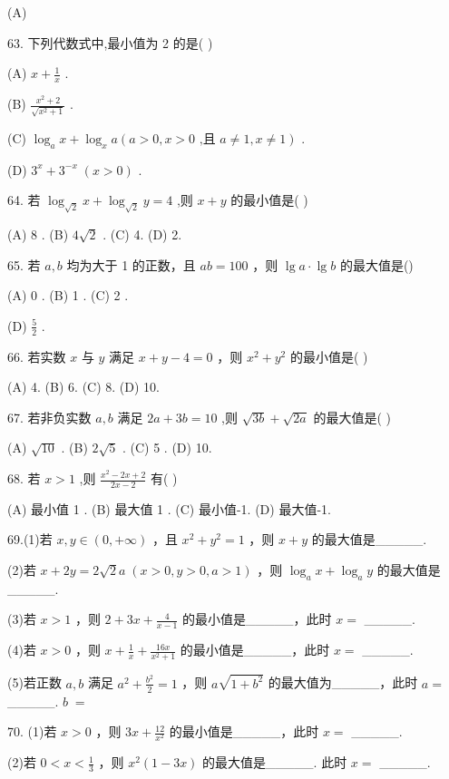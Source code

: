 \documentclass[10pt]{article}
\begin{document}
(A)

63. 下列代数式中,最小值为 2 的是( )

(A) \(x + \frac{1}{x}\) .

(B) \(\frac{{x}^{2} + 2}{\sqrt{{x}^{2} + 1}}\) .

(C) \({\log }_{a}x + {\log }_{x}a\left( {a > 0,x > 0\text{ ,且 }a \neq  1,x \neq  1}\right)\) .

(D) \({3}^{x} + {3}^{-x}\;\left( {x > 0}\right)\) .

64. 若 \({\log }_{\sqrt{2}}x + {\log }_{\sqrt{2}}y = 4\) ,则 \(x + y\) 的最小值是( )

(A) 8 . (B) \(4\sqrt{2}\) . (C) 4. (D) 2.

65. 若 \(a,b\) 均为大于 1 的正数，且 \({ab} = {100}\) ，则 \(\lg a \cdot  \lg b\) 的最大值是()

(A) 0 . (B) 1 . (C) 2 .

(D) \(\frac{5}{2}\) .

66. 若实数 \(x\) 与 \(y\) 满足 \(x + y - 4 = 0\) ，则 \({x}^{2} + {y}^{2}\) 的最小值是( )

(A) 4. (B) 6. (C) 8. (D) 10.

67. 若非负实数 \(a,b\) 满足 \({2a} + {3b} = {10}\) ,则 \(\sqrt{3b} + \sqrt{2a}\) 的最大值是( )

(A) \(\sqrt{10}\) . (B) \(2\sqrt{5}\) . (C) 5 . (D) 10.

68. 若 \(x > 1\) ,则 \(\frac{{x}^{2} - {2x} + 2}{{2x} - 2}\) 有(   )

(A) 最小值 1 . (B) 最大值 1 . (C) 最小值-1. (D) 最大值-1.

69.(1)若 \(x,y \in  \left( {0, + \infty }\right)\) ，且 \({x}^{2} + {y}^{2} = 1\) ，则 \(x + y\) 的最大值是\_\_\_\_\_.

(2)若 \(x + {2y} = {2\sqrt{2}}a\;\left( {x > 0,y > 0,a > 1}\right)\) ，则 \({\log }_{a}x + {\log }_{a}y\) 的最大值是\_\_\_\_\_.

(3)若 \(x > 1\) ，则 \(2 + {3x} + \frac{4}{x - 1}\) 的最小值是\_\_\_\_\_，此时 \(x =\) \_\_\_\_\_.

(4)若 \(x > 0\) ，则 \(x + \frac{1}{x} + \frac{16x}{{x}^{2} + 1}\) 的最小值是\_\_\_\_\_，此时 \(x =\) \_\_\_\_\_.

(5)若正数 \(a,b\) 满足 \({a}^{2} + \frac{{b}^{2}}{2} = 1\) ，则 \(a\sqrt{1 + {b}^{2}}\) 的最大值为\_\_\_\_\_，此时 \(a =\) \_\_\_\_\_. \(b \; =\)

70. (1)若 \(x > 0\) ，则 \({3x} + \frac{12}{{x}^{2}}\) 的最小值是\_\_\_\_\_，此时 \(x =\) \_\_\_\_\_.

(2)若 \(0 < x < \frac{1}{3}\) ，则 \({x}^{2}\left( {1 - {3x}}\right)\) 的最大值是\_\_\_\_\_. 此时 \(x =\) \_\_\_\_\_.
\end{document}
